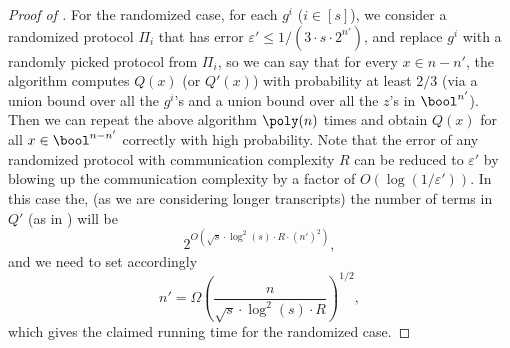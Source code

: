 \begin{proof}[Proof of ]
		For the randomized case, for each $g^i$ ($i\in[s]$), we consider a randomized protocol $\Pi_i$ that has error $\varepsilon'\leq 1/(3\cdot s\cdot2^{n'})$, and replace $g^i$ with a randomly picked protocol from $\Pi_i$, so we can say that for every $x\in{n-n'}$, the algorithm computes $Q(x)$ (or $Q'(x)$) with probability at least $2/3$ (via a union bound over all the $g^i$'s and a union bound over all the $z$'s in $\bool^{n'}$). Then we can repeat the above algorithm $\poly(n)$ times and obtain $Q(x)$ for all $x\in\bool^{n-n'}$ correctly with high probability. Note that the error of any randomized protocol with communication complexity $R$ can be reduced to $\varepsilon'$ by blowing up the communication complexity by a factor of $O(\log(1/\varepsilon'))$. In this case the, (as we are considering longer transcripts) the number of terms in $Q'$ (as in ) will be
		\[
		    2^{O(\sqrt{s}\cdot\log^2(s)\cdot R\cdot (n')^2)},
		\]
		and we need to set accordingly
		\[
		    n'=\Omega\left(\frac{n}{\sqrt{s}\cdot\log^2(s)\cdot R}\right)^{1/2},
		\]
		which gives the claimed running time for the randomized case.
	\end{proof}
